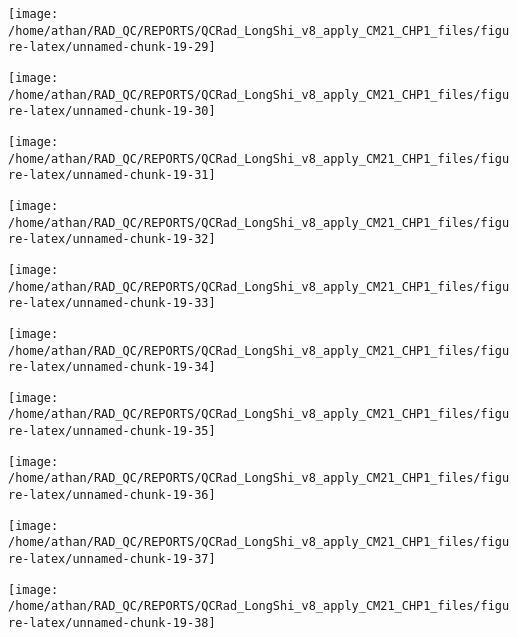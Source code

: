 \documentclass[
  10pt,
  a4paper,oneside]{article}
\begin{document}
\begin{center}\texttt{[image: /home/athan/RAD\_QC/REPORTS/QCRad\_LongShi\_v8\_apply\_CM21\_CHP1\_files/figure-latex/unnamed-chunk-19-29]} \end{center}

\begin{center}\texttt{[image: /home/athan/RAD\_QC/REPORTS/QCRad\_LongShi\_v8\_apply\_CM21\_CHP1\_files/figure-latex/unnamed-chunk-19-30]} \end{center}

\begin{center}\texttt{[image: /home/athan/RAD\_QC/REPORTS/QCRad\_LongShi\_v8\_apply\_CM21\_CHP1\_files/figure-latex/unnamed-chunk-19-31]} \end{center}

\begin{center}\texttt{[image: /home/athan/RAD\_QC/REPORTS/QCRad\_LongShi\_v8\_apply\_CM21\_CHP1\_files/figure-latex/unnamed-chunk-19-32]} \end{center}

\begin{center}\texttt{[image: /home/athan/RAD\_QC/REPORTS/QCRad\_LongShi\_v8\_apply\_CM21\_CHP1\_files/figure-latex/unnamed-chunk-19-33]} \end{center}

\begin{center}\texttt{[image: /home/athan/RAD\_QC/REPORTS/QCRad\_LongShi\_v8\_apply\_CM21\_CHP1\_files/figure-latex/unnamed-chunk-19-34]} \end{center}

\begin{center}\texttt{[image: /home/athan/RAD\_QC/REPORTS/QCRad\_LongShi\_v8\_apply\_CM21\_CHP1\_files/figure-latex/unnamed-chunk-19-35]} \end{center}

\begin{center}\texttt{[image: /home/athan/RAD\_QC/REPORTS/QCRad\_LongShi\_v8\_apply\_CM21\_CHP1\_files/figure-latex/unnamed-chunk-19-36]} \end{center}

\begin{center}\texttt{[image: /home/athan/RAD\_QC/REPORTS/QCRad\_LongShi\_v8\_apply\_CM21\_CHP1\_files/figure-latex/unnamed-chunk-19-37]} \end{center}

\begin{center}\texttt{[image: /home/athan/RAD\_QC/REPORTS/QCRad\_LongShi\_v8\_apply\_CM21\_CHP1\_files/figure-latex/unnamed-chunk-19-38]} \end{center}
\end{document}
